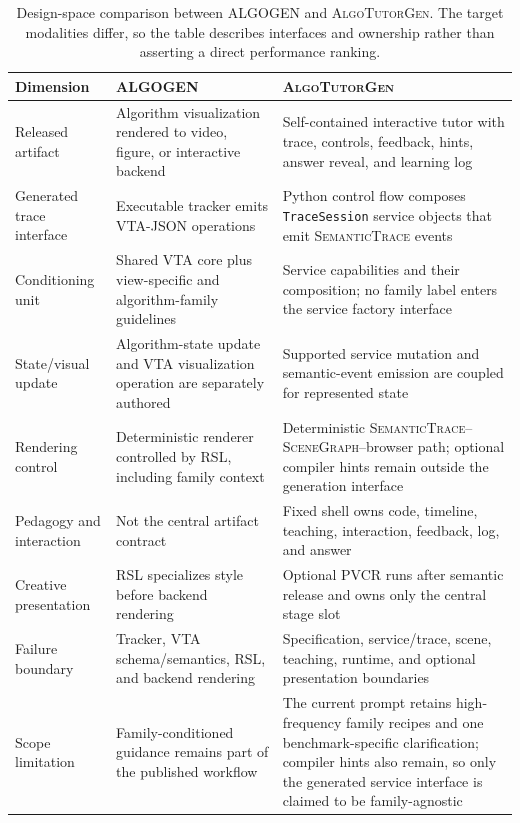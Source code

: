 \documentclass[letterpaper]{article}
\newcommand{\system}{\textsc{AlgoTutorGen}}
\newcommand{\traceir}{\textsc{SemanticTrace}}
\newcommand{\scenegraph}{\textsc{SceneGraph}}
\newcommand{\pvcr}{\textsc{PVCR}}
\begin{document}
\begin{table}[t]
\centering
\footnotesize
\setlength{\tabcolsep}{3pt}
\begin{tabular}{@{}p{}p{}p{}@{}}
\toprule
Dimension & ALGOGEN & \system{} \\
\midrule
Released artifact & Algorithm visualization rendered to video, figure, or interactive backend & Self-contained interactive tutor with trace, controls, feedback, hints, answer reveal, and learning log \\
Generated trace interface & Executable tracker emits VTA-JSON operations & Python control flow composes \texttt{TraceSession} service objects that emit \traceir{} events \\
Conditioning unit & Shared VTA core plus view-specific and algorithm-family guidelines & Service capabilities and their composition; no family label enters the service factory interface \\
State/visual update & Algorithm-state update and VTA visualization operation are separately authored & Supported service mutation and semantic-event emission are coupled for represented state \\
Rendering control & Deterministic renderer controlled by RSL, including family context & Deterministic \traceir{}--\scenegraph{}--browser path; optional compiler hints remain outside the generation interface \\
Pedagogy and interaction & Not the central artifact contract & Fixed shell owns code, timeline, teaching, interaction, feedback, log, and answer \\
Creative presentation & RSL specializes style before backend rendering & Optional \pvcr{} runs after semantic release and owns only the central stage slot \\
Failure boundary & Tracker, VTA schema/semantics, RSL, and backend rendering & Specification, service/trace, scene, teaching, runtime, and optional presentation boundaries \\
Scope limitation & Family-conditioned guidance remains part of the published workflow & The current prompt retains high-frequency family recipes and one benchmark-specific clarification; compiler hints also remain, so only the generated service interface is claimed to be family-agnostic \\
\bottomrule
\end{tabular}
\caption{Design-space comparison between ALGOGEN and \system{}. The target modalities differ, so the table describes interfaces and ownership rather than asserting a direct performance ranking.}
\label{tab:algogen-comparison}
\end{table}
\end{document}
